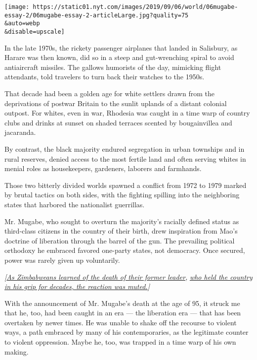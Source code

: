 \texttt{[image: https://static01.nyt.com/images/2019/09/06/world/06mugabe-essay-2/06mugabe-essay-2-articleLarge.jpg?quality=75\\\&auto=webp\\\&disable=upscale]}

In the late 1970s, the rickety passenger airplanes that landed in
Salisbury, as Harare was then known, did so in a steep and gut-wrenching
spiral to avoid antiaircraft missiles. The gallows humorists of the day,
mimicking flight attendants, told travelers to turn back their watches
to the 1950s.

That decade had been a golden age for white settlers drawn from the
deprivations of postwar Britain to the sunlit uplands of a distant
colonial outpost. For whites, even in war, Rhodesia was caught in a time
warp of country clubs and drinks at sunset on shaded terraces scented by
bougainvillea and jacaranda.

By contrast, the black majority endured segregation in urban townships
and in rural reserves, denied access to the most fertile land and often
serving whites in menial roles as housekeepers, gardeners, laborers and
farmhands.

Those two bitterly divided worlds spawned a conflict from 1972 to 1979
marked by brutal tactics on both sides, with the fighting spilling into
the neighboring states that harbored the nationalist guerrillas.

Mr. Mugabe, who sought to overturn the majority's racially defined
status as third-class citizens in the country of their birth, drew
inspiration from Mao's doctrine of liberation through the barrel of the
gun. The prevailing political orthodoxy he embraced favored one-party
states, not democracy. Once secured, power was rarely given up
voluntarily.

\emph{{[}\href{https://www.nytimes.com/2019/09/06/world/africa/mugabe-death-zimbabwe.html?module=inline}{As
Zimbabweans learned of the death of their former leader},}
\href{https://www.nytimes.com/2019/09/06/world/africa/mugabe-death-zimbabwe.html?module=inline}{\emph{who
held the country in his grip for decades, the reaction was
muted.}}\emph{{]}}

With the announcement of Mr. Mugabe's death at the age of 95, it struck
me that he, too, had been caught in an era --- the liberation era ---
that has been overtaken by newer times. He was unable to shake off the
recourse to violent ways, a path embraced by many of his contemporaries,
as the legitimate counter to violent oppression. Maybe he, too, was
trapped in a time warp of his own making.

